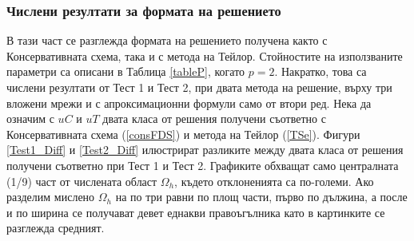 \documentclass{article}
\newcommand{\rf}[1]{(\ref{#1})}
\theoremstyle{remark}
\begin{document}
\subsubsection{Числени резултати за формата на решението}
В тази част се разглежда формата на решението получена както с Консервативната схема, така и с метода на Тейлор. Стойностите на използваните параметри са описани в Таблица \ref{tableP}, когато $p=2$. Накратко, това са числени резултати от Тест 1 и Тест 2, при двата метода на решение, върху три вложени мрежи и с апроксимационни формули само от втори ред. Нека да означим с $uC$ и $uT$ двата класа от решения получени съответно с Консервативната схема \rf{consFDS} и метода на Тейлор \rf{TSe}. 
Фигури \ref{Test1_Diff} и \ref{Test2_Diff} илюстрират разликите между двата класа от решения получени съответно при Тест 1 и Тест 2. Графиките обхващат само централната (1/9) част от числената област $\Omega_h$, където отклоненията са по-големи. Ако разделим мислено $\Omega_h$ на по три равни по площ части, първо по дължина, а после и по ширина се получават девет еднакви правоъгълника като в картинките се разглежда средният.
\end{document}
